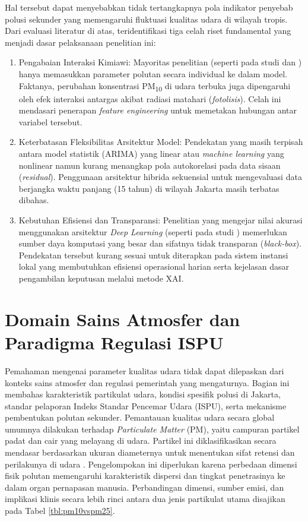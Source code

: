 Hal tersebut dapat menyebabkan tidak tertangkapnya pola indikator penyebab polusi sekunder yang memengaruhi fluktuasi kualitas udara di wilayah tropis. Dari evaluasi literatur di atas, teridentifikasi tiga celah riset fundamental yang menjadi dasar pelaksanaan penelitian ini:

\begin{enumerate}
   \item {Pengabaian Interaksi Kimiawi:} Mayoritas penelitian (seperti pada studi \autocite{alarsy2025pm25} dan \autocite{yenkikar2025explainable}) hanya memasukkan parameter polutan secara individual ke dalam model. Faktanya, perubahan konsentrasi PM\textsubscript{10} di udara terbuka juga dipengaruhi oleh efek interaksi antar\-gas akibat radiasi matahari (\textit{fotolisis}). Celah ini mendasari penerapan \textit{feature engineering} untuk memetakan hubungan antar variabel tersebut.
   \item {Keterbatasan Fleksibilitas Arsitektur Model:} Pendekatan yang masih terpisah antara model statistik (ARIMA) yang linear atau \textit{ma\-chi\-ne lear\-ning} yang non\-li\-ne\-ar namun kurang menangkap pola autokorelasi pada data sisaan (\textit{residual}). Penggunaan arsitektur hibrida sekuensial untuk mengevaluasi data berjangka waktu panjang (15 tahun) di wilayah Jakarta masih terbatas dibahas.
   \item {Kebutuhan Efisiensi dan Transparansi:} Penelitian yang mengejar nilai akurasi menggunakan arsitektur \textit{Deep Learning} (seperti pada studi \autocite{chen2025hybrid}) memerlukan sumber daya komputasi yang besar dan sifatnya tidak transparan (\textit{black-box}). Pendekatan tersebut kurang sesuai untuk diterapkan pada sistem instansi lokal yang membutuhkan efisiensi operasional harian serta kejelasan dasar pengambilan keputusan melalui metode XAI.
\end{enumerate}

\section{Domain Sains Atmosfer dan Paradigma Regulasi ISPU}

Pemahaman mengenai parameter kualitas udara tidak dapat dilepaskan dari konteks sains atmosfer dan regulasi pemerintah yang mengaturnya. Bagian ini membahas karakteristik partikulat udara, kondisi spesifik polusi di Jakarta, standar pelaporan Indeks Standar Pencemar Udara (ISPU), serta mekanisme pembentukan polutan sekunder. Pemantauan kualitas udara secara global umumnya dilakukan terhadap \textit{Particulate Matter} (PM), yaitu campuran partikel padat dan cair yang melayang di udara. Partikel ini diklasifikasikan secara mendasar berdasarkan ukuran diameternya untuk menentukan sifat retensi dan perilakunya di udara \autocite{carb2025inhalable}. Pengelompokan ini diperlukan karena perbedaan dimensi fisik polutan memengaruhi karakteristik dispersi dan tingkat penetrasinya ke dalam organ pernapasan manusia. Perbandingan dimensi, sumber emisi, dan implikasi klinis secara lebih rinci antara dua jenis partikulat utama disajikan pada Tabel \ref{tbl:pm10vspm25}.

